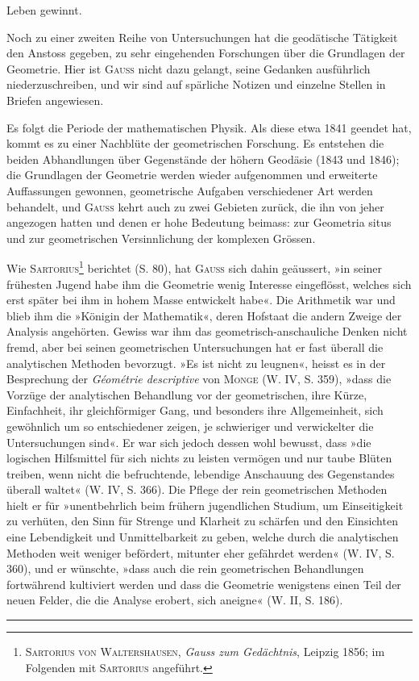 Leben gewinnt.
\par
Noch zu einer zweiten Reihe von Untersuchungen hat die geodätische
Tätigkeit den Anstoss gegeben, zu sehr eingehenden Forschungen über die
Grundlagen der Geometrie. Hier ist \textsc{Gauss} nicht dazu gelangt, seine Gedanken
ausführlich niederzuschreiben, und wir sind auf spärliche Notizen und einzelne
Stellen in Briefen angewiesen.
\par
Es folgt die Periode der mathematischen Physik. Als diese etwa 1841
geendet hat, kommt es zu einer Nachblüte der geometrischen Forschung. Es
entstehen die beiden Abhandlungen über Gegenstände der höhern Geodäsie
(1843 und 1846); die Grundlagen der Geometrie werden wieder aufgenommen
und erweiterte Auffassungen gewonnen, geometrische Aufgaben verschiedener
Art werden behandelt, und \textsc{Gauss} kehrt auch zu zwei Gebieten zurück, die
\clearpage{}
\setcounter{footnote}{0}
\noindent ihn von jeher angezogen hatten und denen er hohe Bedeutung beimass: zur
Geometria situs und zur geometrischen Versinnlichung der komplexen Grössen.
\par
Wie \textsc{Sartorius}\footnote{\textsc{Sartorius von Waltershausen}, \textit{Gauss zum Gedächtnis}, Leipzig 1856; im Folgenden mit \textsc{Sartorius} angeführt.} berichtet (S. 80), hat \textsc{Gauss} sich dahin geäussert, »in
seiner frühesten Jugend habe ihm die Geometrie wenig Interesse eingeflösst,
welches sich erst später bei ihm in hohem Masse entwickelt habe«. Die
Arithmetik war und blieb ihm die »Königin der Mathematik«, deren Hofstaat
die andern Zweige der Analysis angehörten. Gewiss war ihm das geometrisch-anschauliche
Denken nicht fremd, aber bei seinen geometrischen Untersuchungen
hat er fast überall die analytischen Methoden bevorzugt. »Es ist nicht zu
leugnen«, heisst es in der Besprechung der \textit{Géométrie descriptive} von \textsc{Monge}
(W. IV, S. 359), »dass die Vorzüge der analytischen Behandlung vor der
geometrischen, ihre Kürze, Einfachheit, ihr gleichförmiger Gang, und besonders
ihre Allgemeinheit, sich gewöhnlich um so entschiedener zeigen, je
schwieriger und verwickelter die Untersuchungen sind«. Er war sich jedoch
dessen wohl bewusst, dass »die logischen Hilfsmittel für sich nichts zu leisten
vermögen und nur taube Blüten treiben, wenn nicht die befruchtende, lebendige
Anschauung des Gegenstandes überall waltet« (W. IV, S. 366). Die Pflege
der rein geometrischen Methoden hielt er für »unentbehrlich beim frühern
jugendlichen Studium, um Einseitigkeit zu verhüten, den Sinn für Strenge
und Klarheit zu schärfen und den Einsichten eine Lebendigkeit und Unmittelbarkeit
zu geben, welche durch die analytischen Methoden weit weniger befördert,
mitunter eher gefährdet werden« (W. IV, S. 360), und er wünschte,
»dass auch die rein geometrischen Behandlungen fortwährend kultiviert werden
und dass die Geometrie wenigstens einen Teil der neuen Felder, die die Analyse
erobert, sich aneigne« (W. II, S. 186).
\begin{center}\rule{.18\linewidth}{.4pt}\end{center}
\clearpage\endgroup
